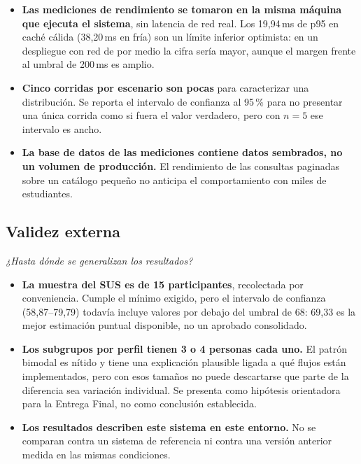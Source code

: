 \documentclass[11pt,a4paper]{article}
\begin{document}
\begin{itemize}[leftmargin=*]
  \item \textbf{Las mediciones de rendimiento se tomaron en la misma
    máquina que ejecuta el sistema}, sin latencia de red real. Los
    19,94\,ms de p95 en caché cálida (38,20\,ms en fría) son un límite
    inferior optimista: en un despliegue con red de por medio la cifra
    sería mayor, aunque el margen frente al umbral de 200\,ms es amplio.
  \item \textbf{Cinco corridas por escenario son pocas} para caracterizar
    una distribución. Se reporta el intervalo de confianza al 95\,\% para
    no presentar una única corrida como si fuera el valor verdadero, pero
    con $n=5$ ese intervalo es ancho.
  \item \textbf{La base de datos de las mediciones contiene datos
    sembrados, no un volumen de producción.} El rendimiento de las
    consultas paginadas sobre un catálogo pequeño no anticipa el
    comportamiento con miles de estudiantes.
\end{itemize}

\subsection{Validez externa}

\emph{¿Hasta dónde se generalizan los resultados?}

\begin{itemize}[leftmargin=*]
  \item \textbf{La muestra del SUS es de 15 participantes},
    recolectada por conveniencia. Cumple el mínimo exigido, pero el
    intervalo de confianza (58,87--79,79) todavía incluye valores por
    debajo del umbral de 68: 69,33 es la mejor estimación puntual
    disponible, no un aprobado consolidado.
  \item \textbf{Los subgrupos por perfil tienen 3 o 4 personas cada uno.}
    El patrón bimodal es nítido y tiene una explicación plausible ligada a
    qué flujos están implementados, pero con esos tamaños no puede
    descartarse que parte de la diferencia sea variación individual. Se
    presenta como hipótesis orientadora para la Entrega Final, no como
    conclusión establecida.
  \item \textbf{Los resultados describen este sistema en este entorno.} No
    se comparan contra un sistema de referencia ni contra una versión
    anterior medida en las mismas condiciones.
\end{itemize}
\end{document}

